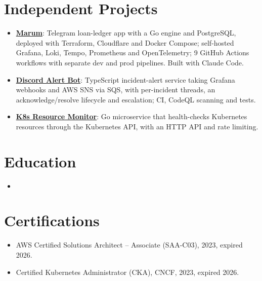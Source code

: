 \documentclass[11pt,a4paper,sans]{moderncv}
\begin{document}

\section{Independent Projects}
\vspace{1pt}
\begin{itemize}
\item \textbf{\href{https://github.com/andranikasd/marumbot}{Marum}}: Telegram loan-ledger app with a Go engine and PostgreSQL, deployed with Terraform, Cloudflare and Docker Compose; self-hosted Grafana, Loki, Tempo, Prometheus and OpenTelemetry; 9 GitHub Actions workflows with separate dev and prod pipelines. Built with Claude Code.
\item \textbf{\href{https://github.com/andranikasd/DiscordAlertingBot}{Discord Alert Bot}}: TypeScript incident-alert service taking Grafana webhooks and AWS SNS via SQS, with per-incident threads, an acknowledge/resolve lifecycle and escalation; CI, CodeQL scanning and tests.
\item \textbf{\href{https://github.com/andranikasd/K8s-Resource-Monitor}{K8s Resource Monitor}}: Go microservice that health-checks Kubernetes resources through the Kubernetes API, with an HTTP API and rate limiting.
\end{itemize}


\section{Education}
\vspace{1pt}
\begin{itemize}

\item{}

\end{itemize}


\section{Certifications}
\vspace{1pt}
\begin{itemize}
\item AWS Certified Solutions Architect -- Associate (SAA-C03), 2023, expired 2026.
\item Certified Kubernetes Administrator (CKA), CNCF, 2023, expired 2026.
\end{itemize}
\end{document}

